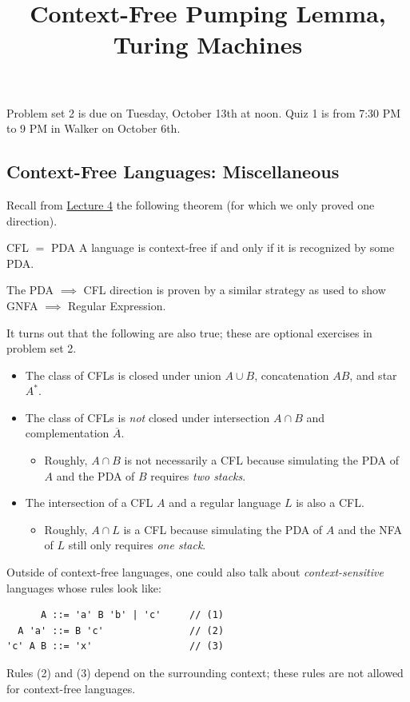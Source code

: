 \title{Context-Free Pumping Lemma, Turing Machines}



Problem set 2 is due on Tuesday, October 13th at noon.
Quiz 1 is from 7:30 PM to 9 PM in Walker on October 6th.

\subsection{Context-Free Languages: Miscellaneous}

Recall from \href{/18.404/lectures/4/#cfls-are-pda-languages}{Lecture 4}
the following theorem (for which we only proved one direction).

\begin{theorem}{CFL $=$ PDA}
    A language is context-free if and only if
    it is recognized by some PDA.
\end{theorem}

The PDA $\implies$ CFL direction is proven by
a similar strategy as used to show GNFA $\implies$ Regular Expression.

It turns out that the following are also true;
these are optional exercises in problem set 2.
\begin{itemize}
    \item The class of CFLs is closed under union $A \cup B$,
    concatenation $AB$, and star $A^*$.
    \item The class of CFLs is \emph{not} closed
    under intersection $A \cap B$ and complementation $\overline{A}$.
    \begin{itemize}
        \item Roughly, $A \cap B$ is not necessarily a CFL
        because simulating the PDA of $A$ and the PDA of $B$
        requires \emph{two stacks}.
    \end{itemize}
    \item The intersection of a CFL $A$ and a regular language $L$
    is also a CFL.
    \begin{itemize}
        \item Roughly, $A \cap L$ is a CFL
        because simulating the PDA of $A$ and the NFA of $L$
        still only requires \emph{one stack}.
    \end{itemize}
\end{itemize}


\begin{remark}
    Outside of context-free languages,
    one could also talk about \emph{context-sensitive} languages
    whose rules look like:
\begin{verbatim}
      A ::= 'a' B 'b' | 'c'     // (1)
  A 'a' ::= B 'c'               // (2)
'c' A B ::= 'x'                 // (3)
\end{verbatim}
    Rules (2) and (3) depend on the surrounding context;
    these rules are not allowed for context-free languages.
\end{remark}

